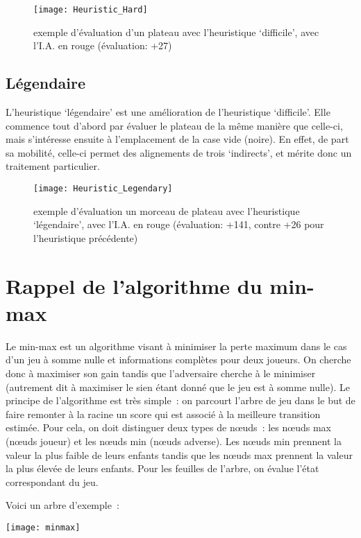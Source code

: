 \begin{figure}
    \centering
    \texttt{[image: Heuristic\_Hard]}{}
    \caption{exemple d'évaluation d'un plateau avec l'heuristique `difficile', avec l'I.A. en rouge (évaluation: +27)}
\end{figure}


\subsection{Légendaire}

L'heuristique `légendaire' est une amélioration de l'heuristique `difficile'. Elle commence tout d'abord par évaluer
le plateau de la même manière que celle-ci, mais s'intéresse ensuite à l'emplacement de la case vide (noire). En effet,
de part sa mobilité, celle-ci permet des alignements de trois `indirects', et mérite donc un traitement particulier.

\begin{figure}
    \centering
    \texttt{[image: Heuristic\_Legendary]}{}
    \caption{exemple d'évaluation un morceau de plateau avec l'heuristique `légendaire', avec l'I.A. en rouge (évaluation: +141, contre +26 pour l'heuristique précédente)}
\end{figure}

\section{Rappel de l'algorithme du min-max}

Le min-max est un algorithme visant à minimiser la perte maximum dans le cas d'un jeu à somme nulle
et informations complètes pour deux joueurs. On cherche donc à
maximiser son gain tandis que l'adversaire cherche à le minimiser (autrement dit à maximiser le
sien étant donné que le jeu est à somme nulle).
Le principe de l'algorithme est très simple : on parcourt l'arbre de jeu dans le but de faire remonter
à la racine un score qui est associé à la meilleure transition estimée.
Pour cela, on doit distinguer deux types de nœuds : les nœuds max (nœuds joueur) et les nœuds min (nœuds adverse).
Les nœuds min prennent la valeur la plus faible de leurs enfants tandis que les nœuds max prennent la valeur la
plus élevée de leurs enfants.
Pour les feuilles de l'arbre, on évalue l'état correspondant du jeu.

Voici un arbre d'exemple :

\texttt{[image: minmax]}

